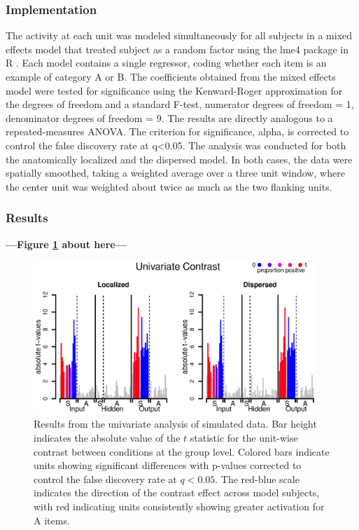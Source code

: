 \subsubsection{Implementation}
The activity at each unit was modeled simultaneously for all subjects in a mixed effects model that treated subject as a random factor \cite{chen_linear_2013, friston_mixed-effects_2005} using the lme4 package in R \cite{bates_linear_2013}. Each model contains a single regressor, coding whether each item is an example of category A or B. The coefficients obtained from the mixed effects model were tested for significance using the Kenward-Roger approximation for the degrees of freedom \cite{kenward_small_1997} and a standard F-test, numerator degrees of freedom = 1, denominator degrees of freedom = 9. The results are directly analogous to a repeated-measures ANOVA. The criterion for significance, alpha, is corrected to control the false discovery rate at q<0.05. The analysis was conducted for both the anatomically localized and the dispersed model. In both cases, the data were spatially smoothed, taking a weighted average over a three unit window, where the center unit was weighted about twice as much as the two flanking units.

\subsubsection{Results} 

\begin{center}
\textbf{---Figure \ref{fig.univariate} about here---}
\end{center}

\begin{figure}
\centering
\includegraphics[width=0.95\textwidth]{figures/univariate.eps}
\caption{Results from the univariate analysis of simulated data. Bar height indicates the absolute value of the $t$ statistic for the unit-wise contrast between conditions at the group level. Colored bars indicate units showing significant differences with p-values corrected to control the false discovery rate at $q<0.05$. The red-blue scale indicates the direction of the contrast effect across model subjects, with red indicating units consistently showing greater activation for A items.}
\label{fig.univariate} 
\end{figure}

